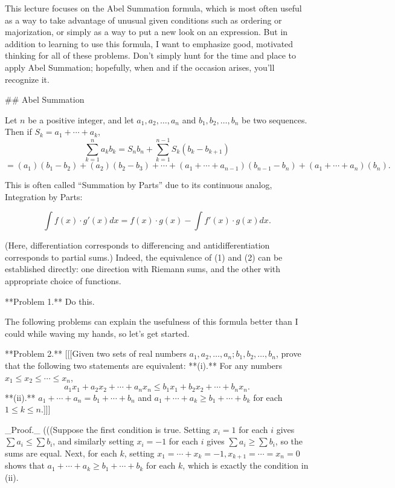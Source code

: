 This lecture focuses on the Abel Summation formula, which is most often useful as a way to take advantage
of unusual given conditions such as ordering or majorization, or simply as a way to put a new look on an
expression. But in addition to learning to use this formula, I want to emphasize good, motivated thinking
for all of these problems. Don’t simply hunt for the time and place to apply Abel Summation; hopefully,
when and if the occasion arises, you’ll recognize it.

## Abel Summation

Let $n$ be a positive integer, and let $a_1, a_2, \ldots, a_n$ and $b_1, b_2, \ldots, b_n$ be two sequences. Then if $S_k = a_1 + \cdots + a_k$, 
\[ \sum_{k=1}^n a_k b_k = S_n b_n + \sum_{k=1}^{n-1} S_k (b_k - b_{k+1}) \]
\[ = (a_1) (b_1 - b_2) + (a_2)(b_2 - b_3) + \cdots + (a_1 + \cdots + a_{n-1})(b_{n-1} - b_n) + (a_1 + \cdots + a_n)(b_n). \]

This is often called “Summation by Parts” due to its continuous analog, Integration by Parts:

\[ \int f(x) \cdot g'(x) dx = f(x) \cdot g(x) - \int f'(x) \cdot g(x) dx. \]

(Here, differentiation corresponds to differencing and antidifferentiation corresponds to partial sums.) Indeed, the equivalence of (1) and (2) can be established directly: one direction with Riemann sums, and the other with appropriate choice of functions.

**Problem 1.** Do this. 

The following problems can explain the usefulness of this formula better than I could while waving my
hands, so let’s get started.

**Problem 2.** [[[Given two sets of real numbers $a_1, a_2, \ldots, a_n; b_1, b_2, \ldots, b_n$, prove that the following two statements are equivalent:  
**(i).** For any numbers $x_1 \leq x_2 \leq \cdots \leq x_n$,  
\[ a_1 x_1 + a_2 x_2 + \cdots + a_n x_n \leq b_1 x_1 + b_2 x_2 + \cdots + b_n x_n. \]
**(ii).** $a_1 + \cdots + a_n = b_1 + \cdots + b_n$ and $a_1 + \cdots + a_k \geq b_1 + \cdots + b_k$ for each $1 \leq k \leq n$.]]]

_Proof._ (((Suppose the first condition is true. Setting $x_i = 1$ for each $i$ gives $\sum a_i \leq \sum b_i$, and similarly setting $x_i = -1$ for each $i$ gives $\sum a_i \geq \sum b_i$, so the sums are equal. Next, for each $k$, setting $x_1 = \cdots + x_k = -1, x_{k+1} = \cdots = x_n = 0$ shows that $a_1 + \cdots + a_k \geq b_1 + \cdots + b_k$ for each $k$, which is exactly the condition in (ii). 

